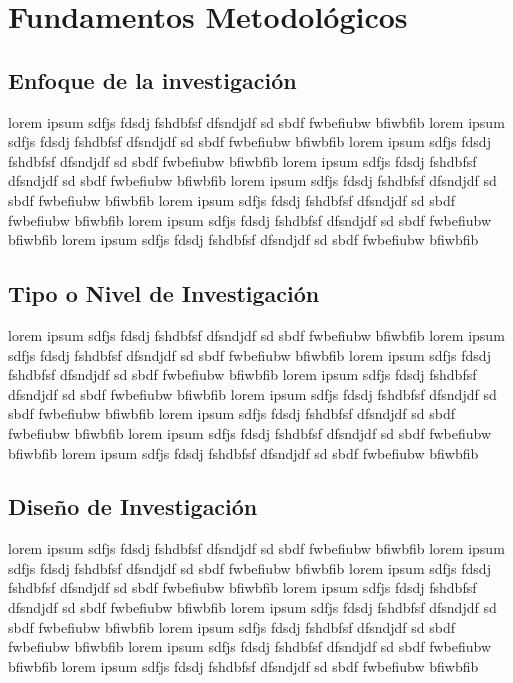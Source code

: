 \chapter{Fundamentos Metodol\'ogicos}

	
\section{Enfoque de la investigaci\'on}
	
	lorem ipsum sdfjs fdsdj fshdbfsf dfsndjdf sd sbdf fwbefiubw bfiwbfib lorem ipsum sdfjs fdsdj fshdbfsf dfsndjdf sd sbdf fwbefiubw bfiwbfib lorem ipsum sdfjs fdsdj fshdbfsf dfsndjdf sd sbdf fwbefiubw bfiwbfib lorem ipsum sdfjs fdsdj fshdbfsf dfsndjdf sd sbdf fwbefiubw bfiwbfib lorem ipsum sdfjs fdsdj fshdbfsf dfsndjdf sd sbdf fwbefiubw bfiwbfib lorem ipsum sdfjs fdsdj fshdbfsf dfsndjdf sd sbdf fwbefiubw bfiwbfib lorem ipsum sdfjs fdsdj fshdbfsf dfsndjdf sd sbdf fwbefiubw bfiwbfib lorem ipsum sdfjs fdsdj fshdbfsf dfsndjdf sd sbdf fwbefiubw bfiwbfib
	
\section{Tipo o Nivel de Investigaci\'on}

	lorem ipsum sdfjs fdsdj fshdbfsf dfsndjdf sd sbdf fwbefiubw bfiwbfib lorem ipsum sdfjs fdsdj fshdbfsf dfsndjdf sd sbdf fwbefiubw bfiwbfib lorem ipsum sdfjs fdsdj fshdbfsf dfsndjdf sd sbdf fwbefiubw bfiwbfib lorem ipsum sdfjs fdsdj fshdbfsf dfsndjdf sd sbdf fwbefiubw bfiwbfib lorem ipsum sdfjs fdsdj fshdbfsf dfsndjdf sd sbdf fwbefiubw bfiwbfib lorem ipsum sdfjs fdsdj fshdbfsf dfsndjdf sd sbdf fwbefiubw bfiwbfib lorem ipsum sdfjs fdsdj fshdbfsf dfsndjdf sd sbdf fwbefiubw bfiwbfib lorem ipsum sdfjs fdsdj fshdbfsf dfsndjdf sd sbdf fwbefiubw bfiwbfib	
	
\section{Dise\~no de Investigaci\'on}
	
	lorem ipsum sdfjs fdsdj fshdbfsf dfsndjdf sd sbdf fwbefiubw bfiwbfib lorem ipsum sdfjs fdsdj fshdbfsf dfsndjdf sd sbdf fwbefiubw bfiwbfib lorem ipsum sdfjs fdsdj fshdbfsf dfsndjdf sd sbdf fwbefiubw bfiwbfib lorem ipsum sdfjs fdsdj fshdbfsf dfsndjdf sd sbdf fwbefiubw bfiwbfib lorem ipsum sdfjs fdsdj fshdbfsf dfsndjdf sd sbdf fwbefiubw bfiwbfib lorem ipsum sdfjs fdsdj fshdbfsf dfsndjdf sd sbdf fwbefiubw bfiwbfib lorem ipsum sdfjs fdsdj fshdbfsf dfsndjdf sd sbdf fwbefiubw bfiwbfib lorem ipsum sdfjs fdsdj fshdbfsf dfsndjdf sd sbdf fwbefiubw bfiwbfib \citep{mixed}
	

